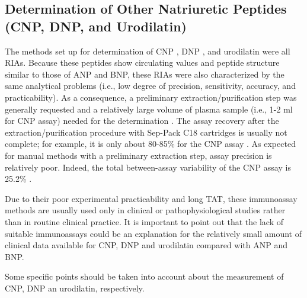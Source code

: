 \documentclass[14pt,a4paper,onecolumn]{extarticle}
\begin{document}
\subsection{ Determination of Other Natriuretic Peptides (CNP, DNP, and Urodilatin)}

The methods set up for determination of CNP \citep{bib298}, DNP \citep{bib299}, and urodilatin \citep{bib2100} \citep{bib2101}
were all RIAs. Because these peptides show circulating values and peptide structure
similar to those of ANP and BNP, these RIAs were also characterized by the same analytical problems (i.e., low degree of precision, sensitivity, accuracy, and practicability).
As a consequence, a preliminary extraction/purification step was generally requested and
a relatively large volume of plasma sample (i.e., 1-2 ml for CNP assay) needed for the
determination \citep{bib295}. The assay recovery after the extraction/purification procedure with
Sep-Pack C18 cartridges is usually not complete; for example, it is only about 80-85\%
for the CNP assay \citep{bib298}. As expected for manual methods with a preliminary extraction
step, assay precision is relatively poor. Indeed, the total between-assay variability of the
CNP assay is 25.2\% \citep{bib298}.

Due to their poor experimental practicability and long TAT, these immunoassay
methods are usually used only in clinical or pathophysiological studies rather than in
routine clinical practice. It is important to point out that the lack of suitable immunoassays could be an explanation for the relatively small amount of clinical data available for
CNP, DNP and urodilatin compared with ANP and BNP.

Some specific points should be taken into account about the measurement of CNP,
DNP an urodilatin, respectively.
\end{document}

